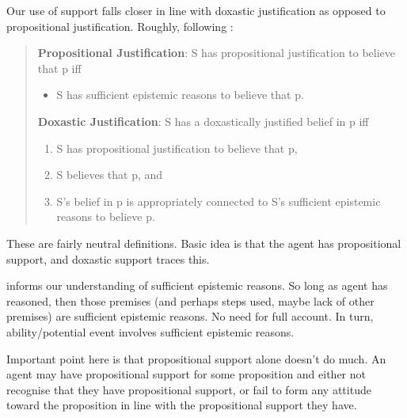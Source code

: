 \begin{note}
    Our use of support falls closer in line with doxastic justification as opposed to propositional justification.
  Roughly, following \textcite{Silva:2020aa}:

  \begin{quote}
    \textbf{Propositional Justification}: S has propositional justification to believe that p iff
    \begin{itemize}
    \item S has sufficient epistemic reasons to believe that p.
    \end{itemize}

    \textbf{Doxastic Justification}: S has a doxastically justified belief in p iff
    \begin{enumerate}[label=(\roman*), ref=(\roman*)]
    \item\label{dj:def:i} S has propositional justification to believe that p,
    \item\label{dj:def:ii} S believes that p, and
    \item\label{dj:def:iii} S's belief in p is appropriately connected to S's sufficient epistemic reasons to believe p.
    \end{enumerate}
  \end{quote}

  These are fairly neutral definitions.
  Basic idea is that the agent has propositional support, and doxastic support traces this.

  \USE{} informs our understanding of sufficient epistemic reasons.
  So long as agent has reasoned, then those premises (and perhaps steps used, maybe lack of other premises) are sufficient epistemic reasons.
  No need for full account.
  In turn, ability/potential event involves sufficient epistemic reasons.

  Important point here is that propositional support alone doesn't do much.
  An agent may have propositional support for some proposition and either not recognise that they have propositional support, or fail to form any attitude toward the proposition in line with the propositional support they have.
\end{note}

